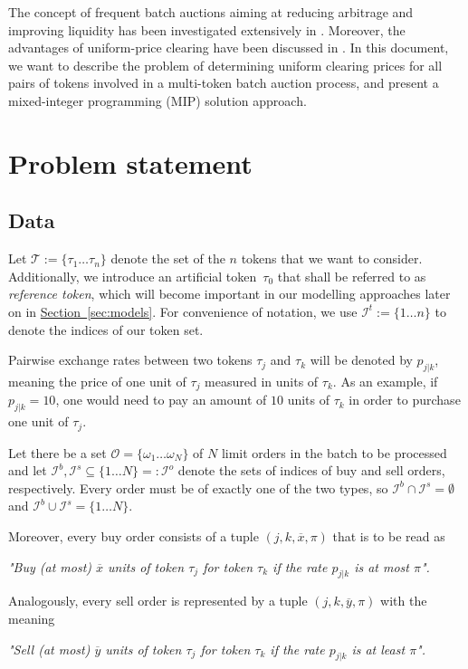 \documentclass[11pt,parskip=full]{scrartcl}%
\newcommand*{\tokens}{\mathcal{T}}          %
\newcommand*{\orders}{\mathcal{O}}          %
\newcommand*{\iorders}{\mathcal{I}^o}       %
\newcommand*{\ibuyorders}{\mathcal{I}^b}    %
\newcommand*{\isellorders}{\mathcal{I}^s}   %
\newcommand*{\secref}[1]{\hyperref[{#1}]{Section~\ref*{#1}}}
\begin{document}
The concept of frequent batch auctions aiming at reducing arbitrage and improving liquidity has
been investigated extensively in \cite{budish:HFT}.
Moreover, the advantages of uniform-price clearing have been discussed in 
\cite{engelbrecht:multi_unit_auctions}.
In this document, we want to describe the problem of determining uniform clearing prices for all
pairs of tokens involved in a multi-token batch auction process, and present a mixed-integer
programming (MIP) solution approach.


\clearpage
\section{Problem statement}
\label{sec:problem}

\subsection{Data}
\label{subsec:data}

Let $ \tokens := \{ \tau_1 \ldots \tau_n \} $ denote the set of the $ n $ tokens that we want to
consider.
Additionally, we introduce an artificial token~$ \tau_0 $ that shall be referred to as 
\emph{reference token}, which will become important in our modelling approaches later on in 
\secref{sec:models}.
For convenience of notation, we use $ \mathcal{I}^t := \{ 1 \ldots n \} $ to denote the indices
of our token set.

Pairwise exchange rates between two tokens $ \tau_j $ and $ \tau_k $ will be denoted by
$ p_{j|k} $, meaning the price of one unit of $ \tau_j $ measured in units of $ \tau_k $.
As an example, if $ p_{j|k} = 10 $, one would need to pay an amount of $ 10 $ units of $ \tau_k $
in order to purchase one unit of $ \tau_j $.

Let there be a set $ \orders = \{ \omega_1 \ldots \omega_N \} $ of $ N $ limit orders in the batch
to be processed and let $ \ibuyorders, \isellorders \subseteq \{ 1 \ldots N \} =: \iorders $ denote
the sets of indices of buy and sell orders, respectively.
Every order must be of exactly one of the two types, so $ \ibuyorders \cap \isellorders =
\emptyset $ and $ \ibuyorders \cup \isellorders = \{ 1 \ldots N \} $.

Moreover, every buy order consists of a tuple $ (j,k,\overline{x},\pi) $ that is to be read as
\vspace{-.6cm}
\begin{center}
  \emph{
    "Buy (at most) $ \overline{x} $ units of token $ \tau_j $ for token $ \tau_k $
    if the rate $ p_{j|k} $ is at most $ \pi $".
  }
\end{center}
\vspace{-.4cm}
Analogously, every sell order is represented by a tuple $ (j,k,\overline{y},\pi) $ with the meaning
\vspace{-.6cm}
\begin{center}
  \emph{
    "Sell (at most) $ \overline{y} $ units of token $ \tau_j $ for token $ \tau_k $
    if the rate $ p_{j|k} $ is at least $ \pi $".
  }
\end{center}
\vspace{-.3cm}
\end{document}
